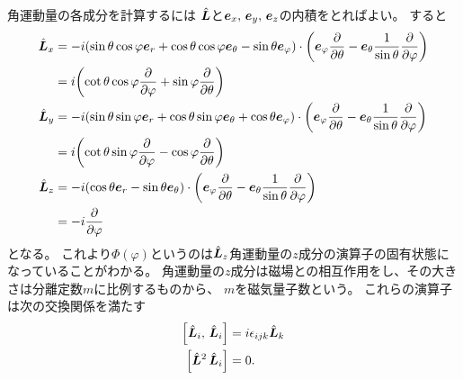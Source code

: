 \documentclass[../../master.tex]{subfiles}
\begin{document}
角運動量の各成分を計算するには
\(\hat{\vb*{L}}\)と\(\vb*{e}_x,\,\vb*{e}_y,\,\vb*{e}_z\)の内積をとればよい。
すると
\begin{align}
	\hat{\vb*{L}}_x
	 & = -i(\sin\theta\cos\varphi \vb*{e}_r + \cos\theta\cos\varphi \vb*{e}_\theta - \sin\theta \vb*{e}_\varphi) \cdot
	\qty(\vb*{e}_{\varphi}\pdv{\theta}-\vb*{e}_{\theta}\frac{1}{\sin\theta}\pdv{\varphi}) \notag                       \\
	 & = i\qty(\cot\theta\cos\varphi\pdv{\varphi}+\sin\varphi\pdv{\theta})                                             \\
	\hat{\vb*{L}}_y
	 & = -i(\sin\theta\sin\varphi \vb*{e}_r + \cos\theta\sin\varphi \vb*{e}_\theta + \cos\theta \vb*{e}_\varphi) \cdot
	\qty(\vb*{e}_{\varphi}\pdv{\theta}-\vb*{e}_{\theta}\frac{1}{\sin\theta}\pdv{\varphi}) \notag                       \\
	 & = i\qty(\cot\theta\sin\varphi\pdv{\varphi}-\cos\varphi\pdv{\theta})                                             \\
	\hat{\vb*{L}}_z
	 & = -i(\cos\theta\vb*{e}_r -\sin\theta\vb*{e}_\theta) \cdot
	\qty(\vb*{e}_{\varphi}\pdv{\theta}-\vb*{e}_{\theta}\frac{1}{\sin\theta}\pdv{\varphi}) \notag                       \\
	 & = -i\pdv{\varphi}
\end{align}
となる。
これより\(\Phi(\varphi)\)というのは\(\hat{\vb*{L}}_z\)角運動量の\(z\)成分の演算子の固有状態になっていることがわかる。
角運動量の\(z\)成分は磁場との相互作用をし、その大きさは分離定数\(m\)に比例するものから、
\(m\)を磁気量子数という。
これらの演算子は次の交換関係を満たす
\begin{align}
	\qty[\hat{\vb*{L}}_i,\,\hat{\vb*{L}}_i] &= i\epsilon_{ijk}\hat{\vb*{L}}_k\\
	\qty[\hat{\vb*{L}}^2\,\hat{\vb*{L}}_i]&=0.
\end{align}
\end{document}
